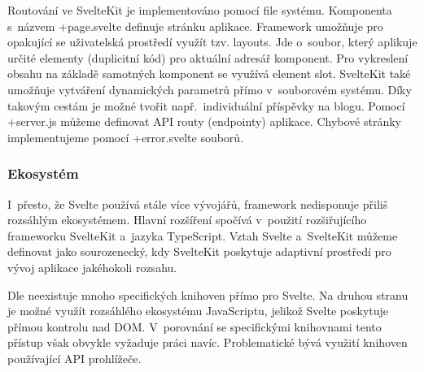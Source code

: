 Routování ve SvelteKit je implementováno pomocí file systému. Komponenta s~názvem +page.svelte definuje stránku aplikace. 
Framework umožňuje pro opakující se uživatelská prostředí využít tzv. layouts. Jde o~soubor, který aplikuje určité elementy (duplicitní kód) pro aktuální adresář komponent. 
Pro vykreslení obsahu na základě samotných komponent se využívá element slot. SvelteKit také umožňuje vytváření dynamických parametrů přímo v~souborovém systému. 
Díky takovým cestám je možné tvořit např.~individuální příspěvky na blogu. Pomocí +server.js můžeme definovat API routy (endpointy) aplikace. 
Chybové stránky implementujeme pomocí +error.svelte souborů.\cite{svelte,sveltekit}

\subsubsection{Ekosystém}

I~přesto, že Svelte používá stále více vývojářů, framework nedisponuje přiliš rozsáhlým ekosystémem. Hlavní rozšíření spočívá v~použití rozšiřujícího frameworku SvelteKit a~jazyka TypeScript. 
Vztah Svelte a~SvelteKit můžeme definovat jako sourozenecký, kdy SvelteKit poskytuje adaptivní prostředí pro vývoj aplikace jakéhokoli rozsahu.

Dle \cite{sveltedailydev} neexistuje mnoho specifických knihoven přímo pro Svelte. 
Na druhou stranu je možné využít rozsáhlého ekosystému JavaScriptu, jelikož Svelte poskytuje přímou kontrolu nad DOM. 
V~porovnání se specifickými knihovnami tento přístup však obvykle vyžaduje práci navíc. 
Problematické bývá využití knihoven používající API prohlížeče.\cite{svelteheyreliable,sveltedailydev,sveltejslibs}
